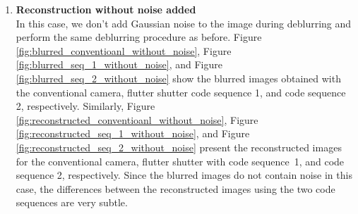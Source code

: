\documentclass[11pt, a4]{article}
\begin{document}
\begin{enumerate}[label=\arabic*.,start=0]
\begin{enumerate}
			\item \textbf{Reconstruction without noise added}\\
			In this case, we don't add Gaussian noise to the image during deblurring and perform the same deblurring procedure as before. Figure \ref{fig:blurred_conventioanl_without_noise}, Figure \ref{fig:blurred_seq_1_without_noise}, and Figure \ref{fig:blurred_seq_2_without_noise} show the blurred images obtained with the conventional camera, flutter shutter code sequence 1, and code sequence 2, respectively. Similarly, Figure \ref{fig:reconstructed_conventioanl_without_noise}, Figure \ref{fig:reconstructed_seq_1_without_noise}, and Figure \ref{fig:reconstructed_seq_2_without_noise} present the reconstructed images for the conventional camera, flutter shutter with code sequence~1, and code sequence 2, respectively. Since the blurred images do not contain noise in this case, the differences between the reconstructed images using the two code sequences are very subtle.
			

\end{enumerate}
\end{enumerate}
\end{document}
